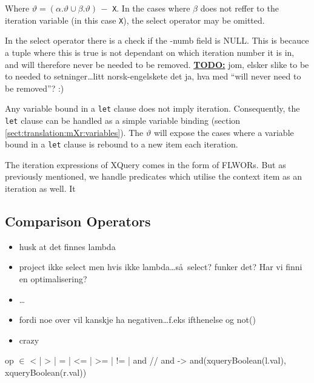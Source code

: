 Where $\vartheta = (\alpha.\vartheta \cup \beta.\vartheta)\, -$ \texttt{X}. In the cases where $\beta$ does not
reffer to the iteration variable (in this case \texttt{X}), the \textsf{select} operator may be omitted.

In the \textsf{select} operator there is a check if the \textsf{-numb} field is \textsf{NULL}. This is becauce a
tuple where this is true is not dependant on which iteration number it is in, and will therefore never be needed
to be removed. \underline{\textbf{\Large TODO:}} jom, elsker slike to be to
needed to setninger\ldots litt norsk-engelskete det ja, hva med ``will never
need to be removed''? :)

Any variable bound in a \texttt{let} clause does not imply iteration. Consequently, the \texttt{let} clause can be
handled as a simple variable binding (section \ref{sect:translation:mXr:variables}). The $\vartheta$ will expose
the cases where a variable bound in a \texttt{let} clause is rebound to a new item each iteration.



The iteration expressions of XQuery comes in the form of FLWORs. But as
previously mentioned, we handle predicates which utilise the context item as an
iteration as well. It 

\subsection{Comparison Operators}
\label{sect:translation:mXr:compOps}

\begin{itemize}
  \item husk at det finnes lambda
  \item project ikke select men hvis ikke lambda\ldots s\aa~select? funker det? Har vi finni en optimalisering?
  \item \ldots
  \item fordi noe over vil kanskje ha negativen\ldots f.eks ifthenelse og not()
  \item crazy
\end{itemize}
op $\in$ {< | > | = | <= | >= | != | and }        // and ->
and(xqueryBoolean(l.val), xqueryBoolean(r.val))
